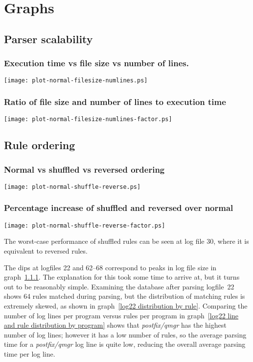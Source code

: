 \documentclass[a4paper,12pt,draft]{article}
\begin{document}
\section{Graphs}

\label{graphs}

\subsection{Parser scalability}

\subsubsection{Execution time vs file size vs number of lines.}
\label{execution time vs file size vs number lines}
\texttt{[image: plot-normal-filesize-numlines.ps]}

\subsubsection{Ratio of file size and number of lines to execution time}
\label{execution time vs file size vs number lines factor}
\texttt{[image: plot-normal-filesize-numlines-factor.ps]}



\subsection{Rule ordering}

\subsubsection{Normal vs shuffled vs reversed ordering}
\label{normal vs shuffled vs reversed ordering}
\texttt{[image: plot-normal-shuffle-reverse.ps]}

\subsubsection{Percentage increase of shuffled and reversed over normal}
\label{normal vs shuffled vs reversed ordering factor}
\texttt{[image: plot-normal-shuffle-reverse-factor.ps]}

The worst-case performance of shuffled rules can be seen at log file 30,
where it is equivalent to reversed rules.

The dips at logfiles 22 and 62--68 correspond to peaks in log file size in
graph~\ref{execution time vs file size vs number lines}.  The explanation
for this took some time to arrive at, but it turns out to be reasonably
simple.  Examining the database after parsing logfile~22 shows 64 rules
matched during parsing, but the distribution of matching rules is extremely
skewed, as shown in graph~\ref{log22 distribution by rule}.  Comparing the
number of log lines per program versus rules per program in
graph~\ref{log22 line and rule distribution by program} shows that
\textit{postfix/qmgr\/} has the highest number of log lines; however it has
a low number of rules, so the average parsing time for a
\textit{postfix/qmgr\/} log line is quite low, reducing the overall average
parsing time per log line.
\end{document}
